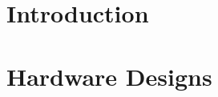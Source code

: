 \section{Introduction}
\label{hardware:Introduction}


\section{Hardware Designs}
\label{hardware:designs}
